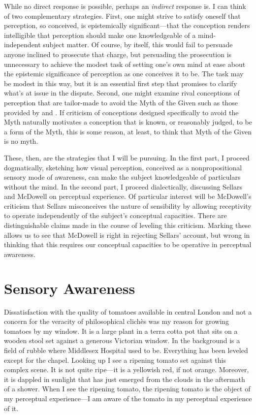 \documentclass[12pt]{article}
\begin{document}
While no direct response is possible, perhaps an \emph{indirect} response is. I can think of two complementary strategies. First, one might strive to satisfy oneself that perception, so conceived, is epistemically significant---that the conception renders intelligible that perception should make one knowledgeable of a mind-independent subject matter. Of course, by itself, this would fail to persuade anyone inclined to prosecute that charge, but persuading the prosecution is unnecessary to achieve the modest task of setting one's own mind at ease about the epistemic significance of perception as one conceives it to be. The task may be modest in this way, but it is an essential first step that promises to clarify what's at issue in the dispute. Second, one might examine rival conceptions of perception that are tailor-made to avoid the Myth of the Given such as those provided by \citet{Sellars:1956xp} and \citet{McDowell:1996uq,McDowell:1998vn,McDowell:2008fk}. If criticism of conceptions designed specifically to avoid the Myth naturally motivates a conception that is known, or reasonably judged, to be a form of the Myth, this is some reason, at least, to think that Myth of the Given is no myth. 

These, then, are the strategies that I will be pursuing. In the first part, I proceed dogmatically, sketching how visual perception, conceived as a nonpropositional sensory mode of awareness, can make the subject knowledgeable of particulars without the mind. In the second part, I proceed dialectically, discussing Sellars and McDowell on perceptual experience. Of particular interest will be McDowell's criticism that Sellars misconceives the nature of sensibility by allowing receptivity to operate independently of the subject's conceptual capacities. There are distinguishable claims made in the course of leveling this criticism. Marking these allows us to see that McDowell is right in rejecting Sellars' account, but wrong in thinking that this requires our conceptual capacities to be operative in perceptual awareness.


\section{Sensory Awareness} %
\label{sec:sensory_awareness}

Dissatisfaction with the quality of tomatoes available in central London and not a concern for the veracity of philosophical clichès was my reason for growing tomatoes by my window. It is a large plant in a terra cotta pot that sits on a wooden stool set against a generous Victorian window. In the background is a field of rubble where Middlesex Hospital used to be. Everything has been leveled except for the chapel. Looking up I see a ripening tomato set against this complex scene. It is not quite ripe---it is a yellowish red, if not orange. Moreover, it is dappled in sunlight that has just emerged from the clouds in the aftermath of a shower. When I see the ripening tomato, the ripening tomato is the object of my perceptual experience---I am aware of the tomato in my perceptual experience of it. 
\end{document}
